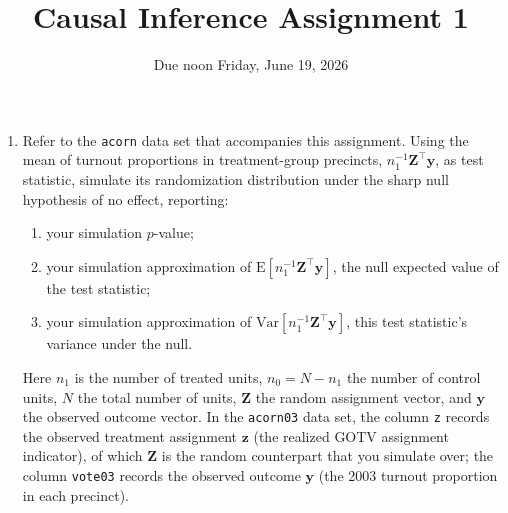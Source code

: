\documentclass{article}
\title{Causal Inference Assignment 1}
\author{Due noon Friday, June 19, 2026}
\renewcommand{\bm}[1]{\boldsymbol{#1}} %
\begin{document}
\maketitle

\begin{enumerate}
\item Refer to the \texttt{acorn} data set that accompanies this assignment.  Using the mean of turnout proportions in
treatment-group precincts, $n_{1}^{-1}\bm{Z}^{\top}\bm{y}$, as
test statistic, simulate its randomization distribution under the
sharp null hypothesis of no effect, reporting: \label{q:simmoments}
\begin{enumerate}
  \item your simulation $p$-value;
  \item your simulation approximation of $\mathrm{E}[
    n_{1}^{-1}\bm{Z}^{\top}\bm{y}]$, the null expected value of the test
    statistic;
  \item your simulation approximation of
    $\mathrm{Var}[n_{1}^{-1}\bm{Z}^{\top}\bm{y}]$, this test
    statistic's variance under the null.
  \end{enumerate}
 Here $n_1$ is the number of treated units, $n_0 = N - n_1$ the number of control units, $N$ the total number of units, $\bm{Z}$ the random assignment vector, and $\bm{y}$ the observed outcome vector.  In the \texttt{acorn03} data set, the column \texttt{z} records the observed treatment assignment $\bm{z}$ (the realized GOTV assignment indicator), of which $\bm{Z}$ is the random counterpart that you simulate over; the column \texttt{vote03} records the observed outcome $\bm{y}$ (the 2003 turnout proportion in each precinct).

\end{enumerate}
\end{document}
